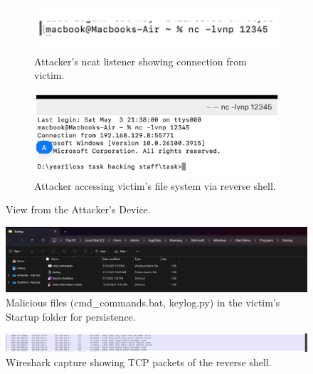 \documentclass[11pt]{article}
\begin{document}
	\begin{figure}[H]
		\centering
		\begin{subfigure}{0.48\linewidth}
			\centering
			\includegraphics[width=\linewidth]{Pictures/ncat_listener_attacker.png} %
			\caption{Attacker's ncat listener showing connection from victim.}
			\label{fig:ncatlistenerattacker}
		\end{subfigure}
		\hfill
		\begin{subfigure}{0.48\linewidth}
			\centering
			\includegraphics[width=\linewidth]{Pictures/attacker_access_victim.png} %
			\caption{Attacker accessing victim's file system via reverse shell.}
			\label{fig:attackeraccessvictim}
		\end{subfigure}
		\caption{View from the Attacker's Device.}
	\end{figure}
	
	\begin{figure}[H]
		\centering
		\includegraphics[width=0.8\linewidth]{Pictures/startup_folder_victim.png} %
		\caption{Malicious files (cmd\_commands.bat, keylog.py) in the victim's Startup folder for persistence.}
		\label{fig:startupfolder}
	\end{figure}
	
	\begin{figure}[H]
		\centering
		\includegraphics[width=\linewidth]{Pictures/wireshark_traffic.png} %
		\caption{Wireshark capture showing TCP packets of the reverse shell.}
		\label{fig:wiresharktraffic}
	\end{figure}
	
\end{document}
